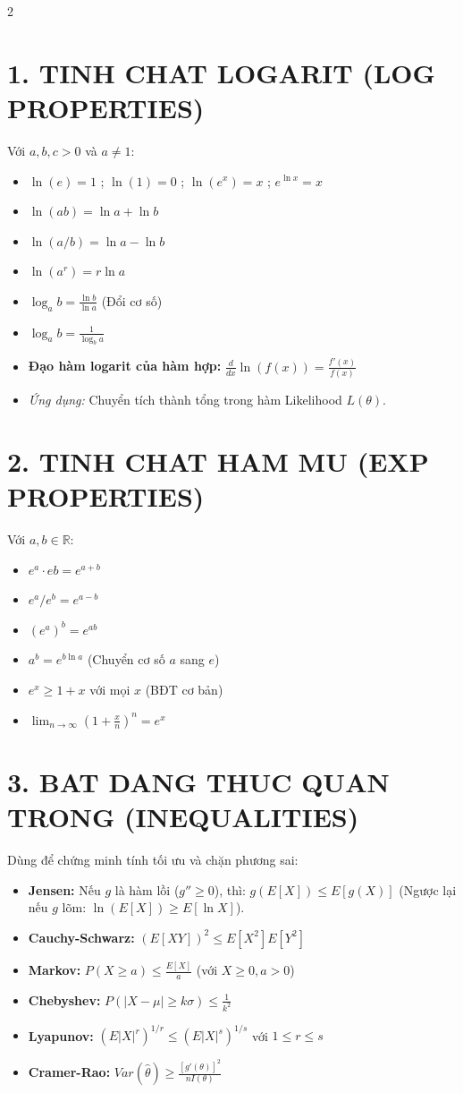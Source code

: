 \documentclass[8pt,a4paper]{article}
\begin{document}
\begin{multicols*}{2}

\section{1. TINH CHAT LOGARIT (LOG PROPERTIES)}
Với $a, b, c > 0$ và $a \neq 1$:
\begin{itemize}
    \item $\ln(e) = 1$ ; $\ln(1) = 0$ ; $\ln(e^x) = x$ ; $e^{\ln x} = x$
    \item $\ln(ab) = \ln a + \ln b$
    \item $\ln(a/b) = \ln a - \ln b$
    \item $\ln(a^r) = r \ln a$
    \item $\log_a b = \frac{\ln b}{\ln a}$ (Đổi cơ số)
    \item $\log_a b = \frac{1}{\log_b a}$
    \item \textbf{Đạo hàm logarit của hàm hợp:} $\frac{d}{dx} \ln(f(x)) = \frac{f'(x)}{f(x)}$
    \item \textit{Ứng dụng:} Chuyển tích thành tổng trong hàm Likelihood $L(\theta)$.
\end{itemize}

\section{2. TINH CHAT HAM MU (EXP PROPERTIES)}
Với $a, b \in \mathbb{R}$:
\begin{itemize}
    \item $e^a \cdot e b = e^{a+b}$
    \item $e^a / e^b = e^{a-b}$
    \item $(e^a)^b = e^{ab}$
    \item $a^b = e^{b \ln a}$ (Chuyển cơ số $a$ sang $e$)
    \item $e^x \geq 1 + x$ với mọi $x$ (BĐT cơ bản)
    \item $\lim_{n \to \infty} (1 + \frac{x}{n})^n = e^x$
\end{itemize}

\section{3. BAT DANG THUC QUAN TRONG (INEQUALITIES)}
Dùng để chứng minh tính tối ưu và chặn phương sai:
\begin{itemize}
    \item \textbf{Jensen:} Nếu $g$ là hàm lồi ($g'' \geq 0$), thì:
    $g(E[X]) \leq E[g(X)]$
    (Ngược lại nếu $g$ lõm: $\ln(E[X]) \geq E[\ln X]$).
    \item \textbf{Cauchy-Schwarz:} $(E[XY])^2 \leq E[X^2]E[Y^2]$
    \item \textbf{Markov:} $P(X \geq a) \leq \frac{E[X]}{a}$ (với $X \geq 0, a > 0$)
    \item \textbf{Chebyshev:} $P(|X - \mu| \geq k\sigma) \leq \frac{1}{k^2}$
    \item \textbf{Lyapunov:} $(E|X|^r)^{1/r} \leq (E|X|^s)^{1/s}$ với $1 \leq r \leq s$
    \item \textbf{Cramer-Rao:} $Var(\hat{\theta}) \geq \frac{[g'(\theta)]^2}{n I(\theta)}$
\end{itemize}


\end{multicols*}
\end{document}

